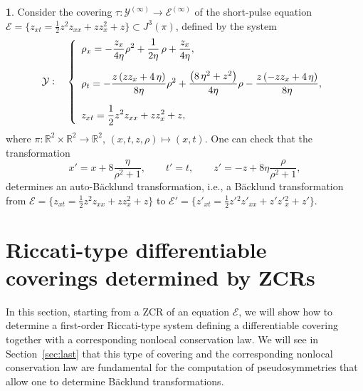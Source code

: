\documentclass[12pt,english]{elsarticle}
\theoremstyle{plain}
\theoremstyle{plain}
\theoremstyle{remark}
\theoremstyle{plain}
\theoremstyle{definition}
\theoremstyle{definition}
\newtheorem{example}[thm]{\protect\examplename}
\providecommand{\examplename}{Example}
\begin{document}
\begin{example}
\label{exa:SP_B11}%
Consider the covering
$\tau :\mathcal{Y}^{(\infty )}\longrightarrow \mathcal{E}^{(\infty )}$
of the short-pulse equation
$\mathcal{E}=\{z_{xt}=\frac{1}{2}z^{2}z_{xx}+zz_{x}^{2}+z\}\subset J^{3}(
\pi )$, defined by the system
%
\begin{equation}
\mathcal{Y}:\quad \left \{
%
\begin{array}{l}
{\displaystyle \rho _{x}=-{\displaystyle \frac{z_{x}}{4\eta}}\rho ^{2}+{
\displaystyle \frac{1}{2\eta}}\,\rho +{\displaystyle
\frac{z_{x}}{4\eta}}},
\vspace{10pt}
\\
{\displaystyle \rho _{t}=-{\displaystyle
\frac{z\left (zz_{x}+4\,\eta \right )}{8\eta}}\rho ^{2}+{
\displaystyle \frac{\left (8\,\eta ^{2}+z^{2}\right )}{4\eta}}\rho -{
\displaystyle \frac{z\left (-zz_{x}+4\,\eta \right )}{8\eta}}},
\vspace{10pt}
\\
{\displaystyle z_{xt}={\displaystyle \frac{1}{2}}z^{2}z_{xx}+zz_{x}^{2}+z},
\end{array}
%
\right .
\label{eq:cov1_SP}
\end{equation}
%
where
$\pi :\mathbb{R}^{2}\times \mathbb{R}^{2}\rightarrow \mathbb{R}^{2}$,
$(x,t,z,\rho )\mapsto (x,t)$. One can check that the transformation
%
\begin{equation}
x'=x+8\frac{\eta}{\rho ^{2}+1},\qquad t'=t,\qquad z'=-z+8\eta
\frac{\rho}{\rho ^{2}+1},
\label{eq:B11_SP}
\end{equation}
%
determines an auto-B\"{a}cklund transformation, i.e., a B\"{a}cklund transformation
from $\mathcal{E}=\{z_{xt}=\frac{1}{2}z^{2}z_{xx}+zz_{x}^{2}+z\}$ to
$\mathcal{E}'=\{z'_{xt}=\frac{1}{2}z'{}^{2}z'_{xx}+z'z'{}_{x}^{2}+z'
\}$.%
\end{example}

\section{Riccati-type differentiable coverings determined by ZCRs}
\label{subsec:Riccati-type-differentiable-cove}

In this section, starting from a ZCR of an equation $\mathcal{E}$, we will
show how to determine a first-order Riccati-type system defining a differentiable
covering together with a corresponding nonlocal conservation law. We will
see in Section~\ref{sec:last} that this type of covering and the corresponding
nonlocal conservation law are fundamental for the computation of pseudosymmetries
that allow one to determine B\"{a}cklund transformations.
\end{document}
